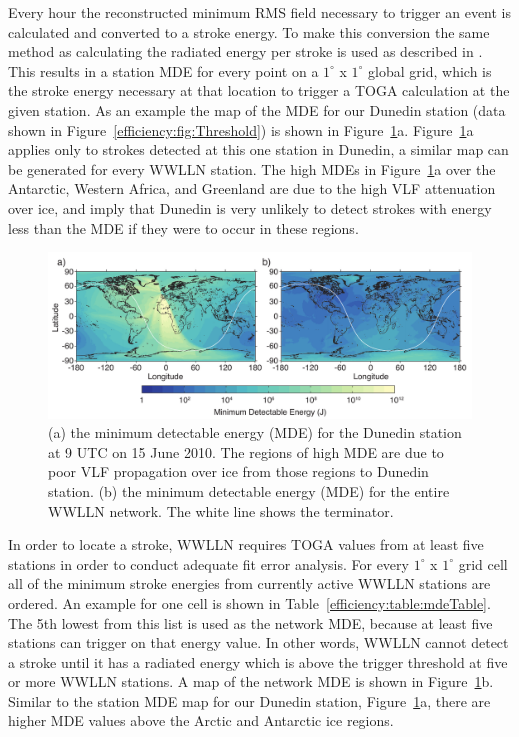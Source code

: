 Every hour the reconstructed minimum RMS field necessary to trigger an event is calculated and converted to a stroke energy.
To make this conversion the same method as calculating the radiated energy per stroke is used as described in \citet{Hutchins2012}.
This results in a station MDE for every point on a $1^\circ$ x $1^\circ$ global grid, which is the stroke energy necessary at that location to trigger a TOGA calculation at the given station.
As an example the map of the MDE for our Dunedin station (data shown in Figure~\ref{efficiency:fig:Threshold}) is shown in Figure~\ref{efficiency:fig:Threshold_Map}a.
Figure~\ref{efficiency:fig:Threshold_Map}a applies only to strokes detected at this one station in Dunedin, a similar map can be generated for every WWLLN station.
The high MDEs in Figure~\ref{efficiency:fig:Threshold_Map}a over the Antarctic, Western Africa, and Greenland are due to the high VLF attenuation over ice, and imply that Dunedin is very unlikely to detect strokes with energy less than the MDE if they were to occur in these regions.

\begin{figure}[ht!]
   \centering
\noindent\includegraphics[scale=0.8]{efficiency/Figures/2012RS005049-p3.pdf}
   \caption{(a) the minimum detectable energy (MDE) for the Dunedin station at 9 UTC on 15 June 2010.
   The regions of high MDE are due to poor VLF propagation over ice from those regions to Dunedin station.
   (b) the minimum detectable energy (MDE) for the entire WWLLN network.
   The white line shows the terminator.}
   \label{efficiency:fig:Threshold_Map}
\end{figure}

In order to locate a stroke, WWLLN requires TOGA values from at least five stations in order to conduct adequate fit error analysis.
For every $1^\circ$ x $1^\circ$ grid cell all of the minimum stroke energies from currently active WWLLN stations are ordered.
An example for one cell is shown in Table~\ref{efficiency:table:mdeTable}.
The 5th lowest from this list is used as the network MDE, because at least five stations can trigger on that energy value.
In other words, WWLLN cannot detect a stroke until it has a radiated energy which is above the trigger threshold at five or more WWLLN stations.
A map of the network MDE is shown in Figure~\ref{efficiency:fig:Threshold_Map}b.
Similar to the station MDE map for our Dunedin station, Figure~\ref{efficiency:fig:Threshold_Map}a, there are higher MDE values above the Arctic and Antarctic ice regions.

